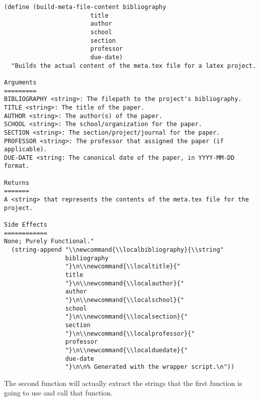 \documentclass[11pt]{article}
\begin{document}
\begin{verbatim}
(define (build-meta-file-content bibliography
                        title
                        author
                        school
                        section
                        professor
                        due-date)
  "Builds the actual content of the meta.tex file for a latex project.

Arguments
=========
BIBLIOGRAPHY <string>: The filepath to the project's bibliography.
TITLE <string>: The title of the paper.
AUTHOR <string>: The author(s) of the paper.
SCHOOL <string>: The school/organization for the paper.
SECTION <string>: The section/project/journal for the paper.
PROFESSOR <string>: The professor that assigned the paper (if applicable).
DUE-DATE <string: The canonical date of the paper, in YYYY-MM-DD format.

Returns
=======
A <string> that represents the contents of the meta.tex file for the project.

Side Effects
============
None; Purely Functional."
  (string-append "\\newcommand{\\localbibliography}{\\string"
                 bibliography
                 "}\n\\newcommand{\\localtitle}{"
                 title
                 "}\n\\newcommand{\\localauthor}{"
                 author
                 "}\n\\newcommand{\\localschool}{"
                 school
                 "}\n\\newcommand{\\localsection}{"
                 section
                 "}\n\\newcommand{\\localprofessor}{"
                 professor
                 "}\n\\newcommand{\\localduedate}{"
                 due-date
                 "}\n\n% Generated with the wrapper script.\n"))
\end{verbatim}

The second function will actually extract the strings that the first function is
going to use and call that function.
\end{document}

